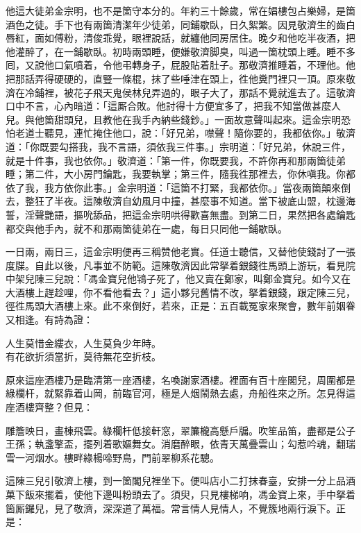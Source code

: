 他這大徒弟金宗明，也不是箇守本分的。年約三十餘歲，常在娼樓包占樂婦，是箇酒色之徒。手下也有兩箇清潔年少徒弟，同鋪歇臥，日久絮繁。{}因見敬濟生的齒白唇紅，面如傅粉，清俊乖覺，眼裡說話，就纏他同房居住。晚夕和他吃半夜酒，把他灌醉了，在一鋪歇臥。初時兩頭睡，便嫌敬濟脚臭，叫過一箇枕頭上睡。睡不多囘，又說他口氣噴着，令他弔轉身子，屁股貼着肚子。那敬濟推睡着，不理他。他把那話弄得硬硬的，直豎一條棍，抹了些唾津在頭上，徃他糞門裡只一頂。原來敬濟在冷鋪裡，被花子飛天鬼侯林兒弄過的，眼子大了，那話不覺就進去了。{}這敬濟口中不言，心內暗道：「這厮合敗。他討得十方便宜多了，把我不知當做甚麼人兒。與他箇甜頭兒，且教他在我手內納些錢鈔。」一面故意聲叫起來。這金宗明恐怕老道士聽見，連忙掩住他口，說：「好兄弟，噤聲！隨你要的，我都依你。」敬濟道：「你既要勾搭我，我不言語，須依我三件事。」{}宗明道：「好兄弟，休說三件，就是十件事，我也依你。」敬濟道：「第一件，你既要我，不許你再和那兩箇徒弟睡；第二件，大小房門鑰匙，我要執掌；第三件，隨我徃那裡去，你休嗔我。你都依了我，我方依你此事。」金宗明道：「這箇不打緊，我都依你。」當夜兩箇顛來倒去，整狂了半夜。這陳敬濟自幼風月中撞，甚麼事不知道。當下被底山盟，枕邊海誓，淫聲艷語，摳吮舔品，{}把這金宗明哄得歡喜無盡。到第二日，果然把各處鑰匙都交與他手內，就不和那兩箇徒弟在一處，每日只同他一鋪歇臥。

一日兩，兩日三，這金宗明便再三稱赞他老實。任道士聽信，又替他使錢討了一張度牒。自此以後，凡事並不防範。這陳敬濟因此常拏着銀錢徃馬頭上游玩，看見院中架兒陳三兒說：「馮金寶兒他鴇子死了，他又賣在鄭家，叫鄭金寶兒。如今又在大酒樓上趕趁哩，你不看他看去？」這小夥兒舊情不改，拏着銀錢，跟定陳三兒，徑徃馬頭大酒樓上來。此不來倒好，若來，正是：五百載冤家來聚會，數年前姻眷又相逢。有詩為證：

\begin{myquote}
人生莫惜金縷衣，人生莫負少年時。\\有花欲折須當折，莫待無花空折枝。
\end{myquote}

原來這座酒樓乃是臨清第一座酒樓，名喚謝家酒樓。裡面有百十座閣兒，周圍都是綠欄杆，就緊靠着山岡，前臨官河，極是人烟鬧熱去處，舟船徃來之所。怎見得這座酒樓齊整？但見：

\begin{myquote}
雕簷映日，畫棟飛雲。綠欄杆低接軒窓，翠簾櫳高懸戶牖。吹笙品笛，盡都是公子王孫；執盞擎盃，擺列着歌嫗舞女。消磨醉眼，依青天萬疊雲山；勾惹吟魂，翻瑞雪一河烟水。樓畔綠楊啼野鳥，門前翠柳系花驄。
\end{myquote}

這陳三兒引敬濟上樓，到一箇閣兒裡坐下。便叫店小二打抹春臺，安排一分上品酒菓下飯來擺着，使他下邊叫粉頭去了。須臾，只見樓梯响，馮金寶上來，手中拏着箇厮鑼兒，見了敬濟，深深道了萬福。常言情人見情人，不覺簇地兩行淚下。{}正是：

